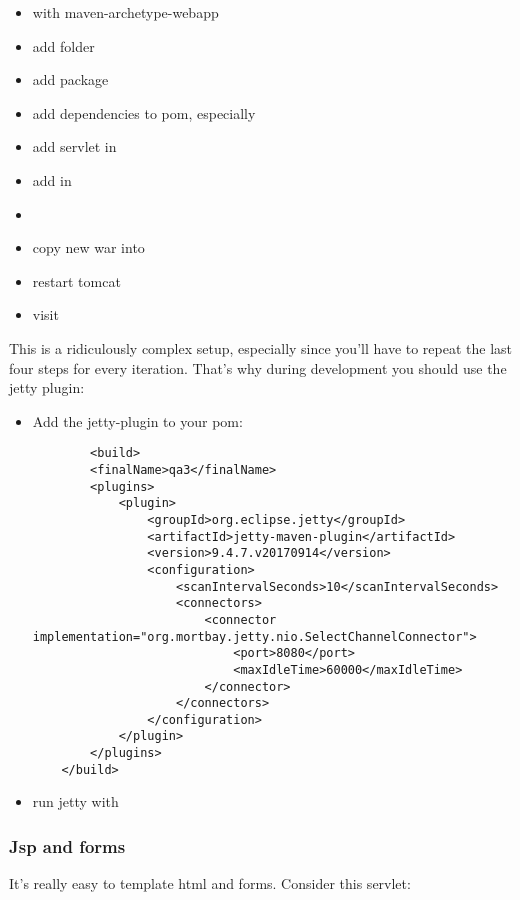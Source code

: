 \begin{itemize}
    \item {} with maven-archetype-webapp
    \item add folder  
    \item add package 
    \item add dependencies to pom, especially 
    \item add servlet in  
    \item add  in 
    \item {}
    \item copy new war into 
    \item restart tomcat
    \item visit 
\end{itemize}

This is a ridiculously complex setup, especially since you'll have to repeat the last four steps for every iteration. That's why during development you should use the jetty plugin:

\begin{itemize}
    \item Add the jetty-plugin to your pom: 
        \begin{lstlisting}
        <build>
		<finalName>qa3</finalName>
		<plugins>
			<plugin>
				<groupId>org.eclipse.jetty</groupId>
				<artifactId>jetty-maven-plugin</artifactId>
				<version>9.4.7.v20170914</version>
				<configuration>
					<scanIntervalSeconds>10</scanIntervalSeconds>
					<connectors>
						<connector implementation="org.mortbay.jetty.nio.SelectChannelConnector">
							<port>8080</port>
							<maxIdleTime>60000</maxIdleTime>
						</connector>
					</connectors>
				</configuration>
			</plugin>
		</plugins>
	</build>
        \end{lstlisting}
        \item run jetty with 
\end{itemize}

\subsubsection{Jsp and forms}

It's really easy to template html and forms. Consider this servlet: 

